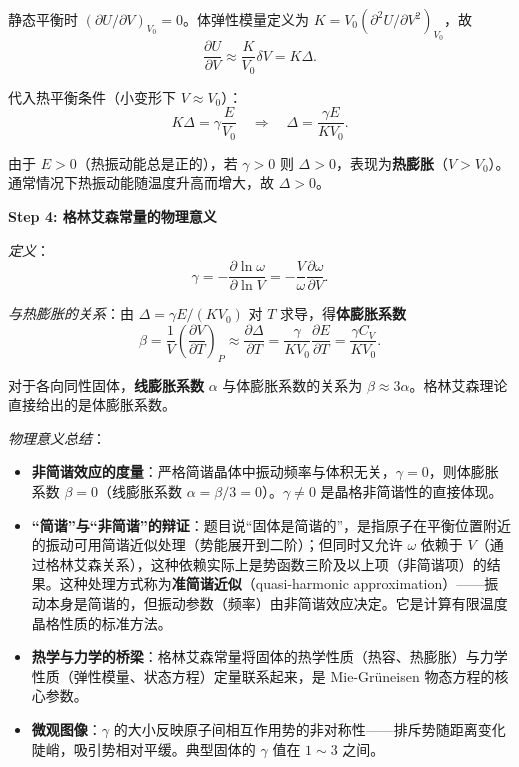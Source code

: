 \begin{derivationbox}[标准解题过程]
静态平衡时 $(\partial U/\partial V)_{V_0}=0$。体弹性模量定义为 $K=V_0(\partial^2U/\partial V^2)_{V_0}$，故
\begin{equation}
\frac{\partial U}{\partial V}\approx\frac{K}{V_0}\delta V=K\Delta.
\end{equation}

代入热平衡条件（小变形下 $V\approx V_0$）：
\begin{equation}
K\Delta=\gamma\frac{E}{V_0}
\quad\Longrightarrow\quad
\boxed{\Delta=\frac{\gamma E}{KV_0}}.
\end{equation}

由于 $E>0$（热振动能总是正的），若 $\gamma>0$ 则 $\Delta>0$，表现为\textbf{热膨胀}（$V>V_0$）。通常情况下热振动能随温度升高而增大，故 $\Delta>0$。

\textbf{Step 4: 格林艾森常量的物理意义}

\textit{定义}：
\begin{equation}
\gamma=-\frac{\partial\ln\omega}{\partial\ln V}
=-\frac{V}{\omega}\frac{\partial\omega}{\partial V}.
\end{equation}


\textit{与热膨胀的关系}：由 $\Delta=\gamma E/(KV_0)$ 对 $T$ 求导，得\textbf{体膨胀系数}
\begin{equation}
\beta=\frac{1}{V}\left(\frac{\partial V}{\partial T}\right)_P\approx\frac{\partial\Delta}{\partial T}
=\frac{\gamma}{KV_0}\frac{\partial E}{\partial T}
=\frac{\gamma C_V}{KV_0}.
\end{equation}

对于各向同性固体，\textbf{线膨胀系数} $\alpha$ 与体膨胀系数的关系为 $\beta\approx3\alpha$。格林艾森理论直接给出的是体膨胀系数。

\textit{物理意义总结}：
\begin{itemize}
    \item \textbf{非简谐效应的度量}：严格简谐晶体中振动频率与体积无关，$\gamma=0$，则体膨胀系数 $\beta=0$（线膨胀系数 $\alpha=\beta/3=0$）。$\gamma\neq0$ 是晶格非简谐性的直接体现。
    \item \textbf{``简谐''与``非简谐''的辩证}：题目说``固体是简谐的''，是指原子在平衡位置附近的振动可用简谐近似处理（势能展开到二阶）；但同时又允许 $\omega$ 依赖于 $V$（通过格林艾森关系），这种依赖实际上是势函数三阶及以上项（非简谐项）的结果。这种处理方式称为\textbf{准简谐近似}（quasi-harmonic approximation）——振动本身是简谐的，但振动参数（频率）由非简谐效应决定。它是计算有限温度晶格性质的标准方法。
    \item \textbf{热学与力学的桥梁}：格林艾森常量将固体的热学性质（热容、热膨胀）与力学性质（弹性模量、状态方程）定量联系起来，是 Mie-Gr\"uneisen 物态方程的核心参数。
    \item \textbf{微观图像}：$\gamma$ 的大小反映原子间相互作用势的非对称性——排斥势随距离变化陡峭，吸引势相对平缓。典型固体的 $\gamma$ 值在 $1\sim3$ 之间。
\end{itemize}
\end{derivationbox}

